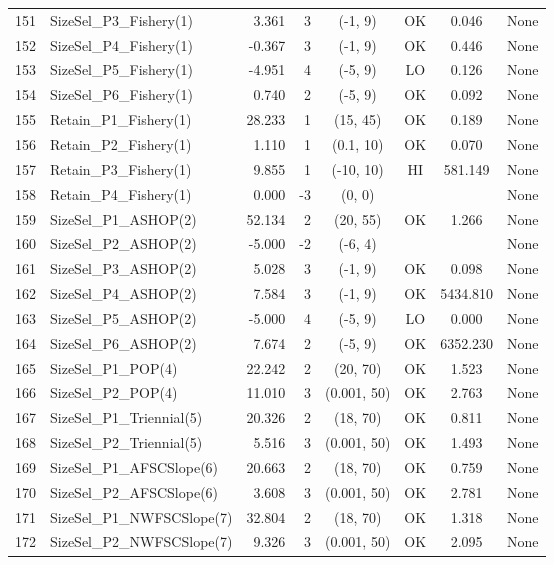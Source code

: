 \documentclass[12pt,]{article}
\begin{document}
\begin{landscape}
\begin{longtable}{rlrrcccl}
  151 & SizeSel\_P3\_Fishery(1) & 3.361 & 3 & (-1, 9) & OK & 0.046 & None \\ 
  152 & SizeSel\_P4\_Fishery(1) & -0.367 & 3 & (-1, 9) & OK & 0.446 & None \\ 
  153 & SizeSel\_P5\_Fishery(1) & -4.951 & 4 & (-5, 9) & LO & 0.126 & None \\ 
  154 & SizeSel\_P6\_Fishery(1) & 0.740 & 2 & (-5, 9) & OK & 0.092 & None \\ 
  155 & Retain\_P1\_Fishery(1) & 28.233 & 1 & (15, 45) & OK & 0.189 & None \\ 
  156 & Retain\_P2\_Fishery(1) & 1.110 & 1 & (0.1, 10) & OK & 0.070 & None \\ 
  157 & Retain\_P3\_Fishery(1) & 9.855 & 1 & (-10, 10) & HI & 581.149 & None \\ 
  158 & Retain\_P4\_Fishery(1) & 0.000 & -3 & (0, 0) &  &  & None \\ 
  159 & SizeSel\_P1\_ASHOP(2) & 52.134 & 2 & (20, 55) & OK & 1.266 & None \\ 
  160 & SizeSel\_P2\_ASHOP(2) & -5.000 & -2 & (-6, 4) &  &  & None \\ 
  161 & SizeSel\_P3\_ASHOP(2) & 5.028 & 3 & (-1, 9) & OK & 0.098 & None \\ 
  162 & SizeSel\_P4\_ASHOP(2) & 7.584 & 3 & (-1, 9) & OK & 5434.810 & None \\ 
  163 & SizeSel\_P5\_ASHOP(2) & -5.000 & 4 & (-5, 9) & LO & 0.000 & None \\ 
  164 & SizeSel\_P6\_ASHOP(2) & 7.674 & 2 & (-5, 9) & OK & 6352.230 & None \\ 
  165 & SizeSel\_P1\_POP(4) & 22.242 & 2 & (20, 70) & OK & 1.523 & None \\ 
  166 & SizeSel\_P2\_POP(4) & 11.010 & 3 & (0.001, 50) & OK & 2.763 & None \\ 
  167 & SizeSel\_P1\_Triennial(5) & 20.326 & 2 & (18, 70) & OK & 0.811 & None \\ 
  168 & SizeSel\_P2\_Triennial(5) & 5.516 & 3 & (0.001, 50) & OK & 1.493 & None \\ 
  169 & SizeSel\_P1\_AFSCSlope(6) & 20.663 & 2 & (18, 70) & OK & 0.759 & None \\ 
  170 & SizeSel\_P2\_AFSCSlope(6) & 3.608 & 3 & (0.001, 50) & OK & 2.781 & None \\ 
  171 & SizeSel\_P1\_NWFSCSlope(7) & 32.804 & 2 & (18, 70) & OK & 1.318 & None \\ 
  172 & SizeSel\_P2\_NWFSCSlope(7) & 9.326 & 3 & (0.001, 50) & OK & 2.095 & None \\ 

\end{longtable}
\end{landscape}
\end{document}

